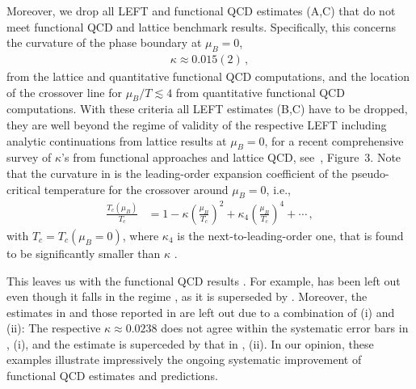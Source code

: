 \documentclass[reprint,twocolumn,superscriptaddress,preprintnumbers,amsmath,amssymb,aps,prd,floatfix]{revtex4-2}
\begin{document}
Moreover, we drop all LEFT and functional QCD estimates  (A,C) that do not meet functional QCD and lattice benchmark results. Specifically, this concerns the curvature of the phase boundary at $\mu_B=0$, 
%
\begin{align}
    \kappa \approx 0.015(2)\,, \label{eq:kappaBenchmark}
\end{align} 
%
from the lattice and quantitative functional QCD computations, and the location of the crossover line for $\mu_B/T\lesssim 4$ from quantitative functional QCD computations. With these criteria all LEFT estimates (B,C) have to be dropped, they are well beyond the regime of validity of the respective LEFT including analytic continuations from lattice results at $\mu_B=0$, for a recent  comprehensive survey of $\kappa$'s from functional approaches and lattice QCD, see~\cite{Bernhardt:2023ezo}, Figure~3. Note that the curvature in  is the leading-order expansion coefficient of the pseudo-critical temperature for the crossover around $\mu_B=0$, i.e.,
%
\begin{align}
    \frac{T_c(\mu_B)}{T_c}&=1-\kappa \left(\frac{\mu_B}{T_c}\right)^2+\kappa_4 \left(\frac{\mu_B}{T_c}\right)^4+\cdots\,,\label{eq:curv-defi}
\end{align}
%
with $T_c=T_c(\mu_B=0)$, where $\kappa_4$ is the next-to-leading-order one, that is found to be significantly smaller than $\kappa$ \cite{Bernhardt:2023ezo}.

This leaves us with the functional QCD results  \cite{Fu:2019hdw, Gao:2020fbl, Gunkel:2021oya}. For example, \cite{Gao:2020qsj} has been left out even though it falls in the regime , as it is superseded by \cite{Gao:2020fbl}. Moreover, the estimates in \cite{Isserstedt:2019pgx} and those reported in \cite{Fischer:2018sdj} are left out due to a combination of (i) and (ii): The respective $\kappa\approx 0.0238$ does not agree within the systematic error bars in , (i), and the estimate is superceded by that in \cite{Gunkel:2021oya}, (ii). In our opinion, these examples illustrate impressively the ongoing systematic improvement of functional QCD estimates and predictions. 
\end{document}
